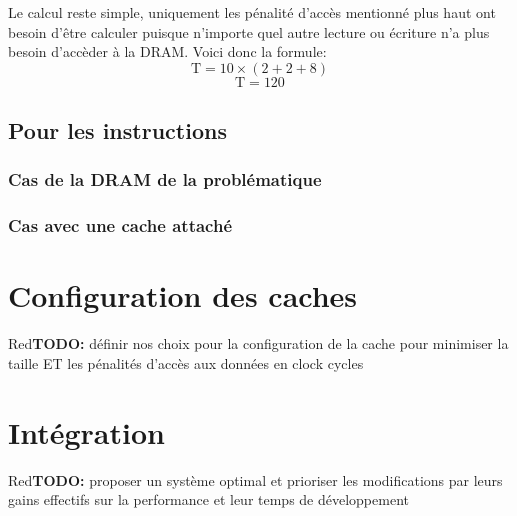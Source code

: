 \documentclass[a11paper]{article}
\newcommand{\todo}[1]{\begin{color}{Red}\textbf{TODO:} #1\end{color}}
\begin{document}
Le calcul reste simple, uniquement les pénalité d'accès mentionné plus haut ont besoin d'être calculer puisque n'importe quel autre lecture ou écriture n'a plus besoin d'accèder à
la DRAM. Voici donc la formule:
$$
\text{T} = 10\times(2+2+8)
$$
$$
\text{T} = 120
$$

\subsection{Pour les instructions}
\subsubsection{Cas de la DRAM de la problématique}

\subsubsection{Cas avec une cache attaché}



\section{Configuration des caches}

\todo{définir nos choix pour la configuration de la cache pour minimiser la
taille ET les pénalités d'accès aux données en clock cycles}

\section{Intégration}

\todo{proposer un système optimal et prioriser les modifications par leurs
gains effectifs sur la performance et leur temps de développement}
\end{document}

